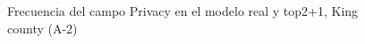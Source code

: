 \begin{figure}[H]
    \centering
    
    \caption{Frecuencia del campo Privacy en el modelo real y top2+1, King county (A-2)}
    \label{frecuency-top2+1-privacy}
\end{figure}